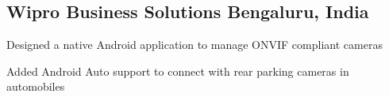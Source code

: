 \documentclass[letter,10pt]{article}
\begin{document}

\subsection{Wipro Business Solutions \hfill Bengaluru, India}
\begin{zitemize}
\item Designed a native Android application to manage ONVIF compliant cameras
\item Added Android Auto support to connect with rear parking cameras in automobiles
\end{zitemize}

\end{document}
